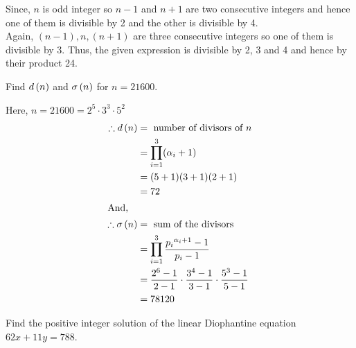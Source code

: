 \documentclass[12pt]{book}
\begin{document}
\begin{soln}
    Since, $ n $ is odd integer so $ n-1 $ and $ n+1 $ are two consecutive integers and hence one of them is divisible by 2 and the other is divisible by 4.\\

    Again, $ (n-1),n,(n+1) $ are three consecutive integers so one of them is divisible by 3. Thus, the given expression is divisible by 2, 3 and 4 and hence by their product 24.
\end{soln}
\begin{qn}
    Find $ d\left( n \right) $ and $ \sigma\left( n \right) $ for $ n=21600 $.
\end{qn}
\begin{soln}
    Here, $ n=21600=2^5\cdot3^3\cdot5^2 $\\
    \begin{align*}
        \therefore d\left( n \right)&=\text{ number of divisors of } n\\
        &=\prod_{i=1}^3 (\alpha_i+1)\\
        &=(5+1)(3+1)(2+1)\\
        &=72\\
        \intertext{And,}
        \therefore \sigma\left( n \right)&=\text{ sum of the divisors }\\
        &=\prod_{i=1}^3 \frac{{p_i}^{\alpha_i+1}-1}{p_i-1}\\
        &=\frac{2^{6}-1}{2-1}\cdot \frac{3^{4}-1}{3-1}\cdot\frac{5^{3}-1}{5-1}\\
        &=78120\\
    \end{align*}
\end{soln}
\begin{qn}
    Find the positive integer solution of the linear Diophantine equation $ 62x+11y=788 $.
\end{qn}
\end{document}
